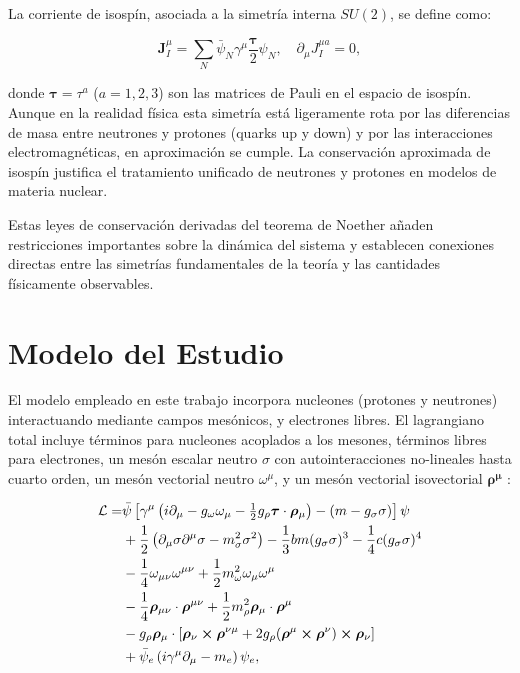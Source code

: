 La corriente de isospín, asociada a la simetría interna $SU(2)$, se define como:

\begin{equation}
	\boldsymbol{J}_I^{\mu} = \sum_N \bar{\psi}_N \gamma^\mu \frac{\boldsymbol{\tau}}{2} \psi_N, \quad \partial_\mu J_I^{\mu a} = 0,
	\label{eq:corriente_isospin}
\end{equation}

donde $\boldsymbol{\tau} = \tau^a$ ($a = 1, 2, 3$) son las matrices de Pauli en el espacio de isospín. Aunque en la realidad física esta simetría está ligeramente rota por las diferencias de masa entre neutrones y protones (quarks up y down) y por las interacciones electromagnéticas, en aproximación se cumple. La conservación aproximada de isospín justifica el tratamiento unificado de neutrones y protones en modelos de materia nuclear.

Estas leyes de conservación derivadas del teorema de Noether añaden restricciones importantes sobre la dinámica del sistema y establecen conexiones directas entre las simetrías fundamentales de la teoría y las cantidades físicamente observables.


\section{Modelo del Estudio}

El modelo empleado en este trabajo incorpora nucleones (protones y neutrones) interactuando mediante campos mesónicos, y electrones libres. El lagrangiano total incluye términos para nucleones acoplados a los mesones, términos libres para electrones, un mesón escalar neutro $\sigma$ con autointeracciones no-lineales hasta cuarto orden, un mesón vectorial neutro $\omega^\mu$, y un mesón vectorial isovectorial $\boldsymbol{\rho^\mu}$ \cite{glendenningCompactStarsNuclear2000}:

\begin{equation}
	\begin{aligned}
		\mathcal{L} = &\bar{\psi} \left[ \gamma^\mu \left( i\partial_\mu - g_{\omega} \omega_\mu - \tfrac{1}{2} g_{\rho} \boldsymbol{\tau} \cdot \boldsymbol{\rho}_\mu \right) - (m - g_{\sigma} \sigma) \right] \psi  \\
		&+ \frac{1}{2} \left( \partial_\mu \sigma \partial^\mu \sigma - m_\sigma^2 \sigma^2 \right) - \frac{1}{3}bm (g_\sigma\sigma)^3 - \frac{1}{4}c(g_\sigma\sigma)^4  \\
		&- \frac{1}{4} \omega_{\mu\nu} \omega^{\mu\nu} + \frac{1}{2} m_\omega^2 \omega_\mu \omega^\mu  \\
		&- \frac{1}{4} \boldsymbol{\rho}_{\mu\nu} \cdot \boldsymbol{\rho}^{\mu\nu} + \frac{1}{2} m_\rho^2 \boldsymbol{\rho}_\mu \cdot \boldsymbol{\rho}^\mu \\
		&- g_\rho \boldsymbol{\rho}_\mu \cdot [\boldsymbol{\rho}_\nu \cross \boldsymbol{\rho}^{\nu\mu} + 2g_\rho(\boldsymbol{\rho}^\mu \cross \boldsymbol{\rho}^\nu) \cross \boldsymbol{\rho}_\nu] \\
		&+ \bar{\psi}_e \left( i\gamma^\mu \partial_\mu - m_e \right) \psi_e,
		\label{eq:lagrangiano}
	\end{aligned}
\end{equation}

